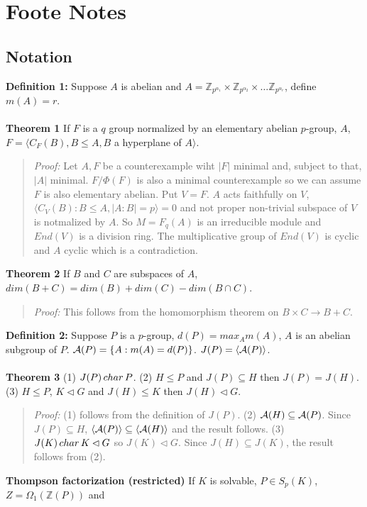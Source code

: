 \chapter{Foote Notes}
\section{Notation}
{\bf Definition 1:}  Suppose $A$ is abelian and
$A= {\mathbb Z}_{p^{\alpha_1}} \times {\mathbb Z}_{p^{\alpha_2}} \times \ldots {\mathbb Z}_{p^{\alpha_r}}$, define
$m(A)=r$.
\\
\\
{\bf Theorem 1} If $F$ is a $q$ group normalized by an elementary abelian $p$-group, $A$,
$F= \langle C_F(B), B \leq A, B$ a hyperplane of $A \rangle$.
\begin{quote}
\emph{Proof:}  
Let $A, F$ be a counterexample wiht $|F|$ minimal and, subject to that, $|A|$ minimal.
$F/\Phi(F)$ is also a minimal counterexample so we can assume $F$ is also elementary abelian.
Put $V=F$.
$A$ acts faithfully on $V$, $\langle C_V(B): B \leq A, |A:B|=p \rangle = 0$ and
not proper non-trivial subspace of $V$ is notmalized by $A$. So $M=F_q(A)$ is an irreducible
module and $End(V)$ is a division ring. The multiplicative group of $End(V)$ is cyclic and $A$ cyclic
which is a contradiction.
\end{quote}
{\bf Theorem 2} If $B$ and $C$ are subspaces of $A$, $dim(B+C)= dim(B) + dim(C)- dim(B \cap C)$.
\begin{quote}
\emph{Proof:}  This follows from the homomorphism theorem on $B \times C \rightarrow B+C$.
\end{quote}
{\bf Definition 2:}  Suppose $P$ is a $p$-group, $d(P) = max_{A} m(A)$, $A$ is an abelian subgroup of $P$. 
${\cal A}(P)= \{ A: m(A)=d(P) \}$.  $J(P) = \langle {\cal A}(P) \rangle$.
\\
\\
{\bf Theorem 3} (1) $J(P) \thinspace char \thinspace P$.
(2) $H \leq P$ and $J(P) \subseteq H$ then $J(P)= J(H)$.
(3) $H \leq P$, $K \lhd G$ and $J(H) \leq K$ then $J(H) \lhd G$.
\begin{quote}
\emph{Proof:}  (1) follows from the definition of $J(P)$.  (2) ${\cal A}(H) \subseteq {\cal A}(P)$.  Since
$J(P) \subseteq H$, $\langle {\cal A}(P) \rangle \subseteq \langle {\cal A}(H) \rangle$ and the result follows.
(3) $J(K) \thinspace char \thinspace K \lhd G$ so $J(K) \lhd G$.  Since $J(H) \subseteq J(K)$, the result follows from (2).
\end{quote}
{\bf Thompson factorization (restricted)} If $K$ is solvable, $P \in S_p(K)$, $Z= \Omega_1({\mathbb Z}(P))$ and 
